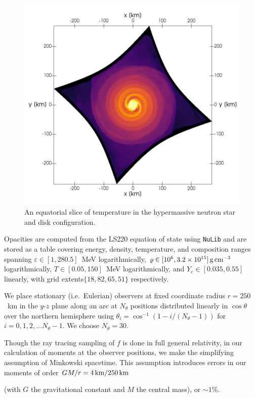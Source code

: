 \documentclass[aps,floatfix,prd,superscriptaddress,twocolumn]{revtex4-1}
\newcommand{\todo}[1]{\marginpar{\tiny{\textcolor{red}{#1}}}}
\renewcommand\todo[1]{} %
\begin{document}
\begin{figure}
  \includegraphics[width=\columnwidth]{production-colormap-equat-temp}
  \caption{An equatorial slice of temperature in the hypermassive neutron
    star and disk configuration.}
  \label{fig:nsns_temp_equat}
\end{figure}

Opacities are computed from the LS220 equation of state using
\lstinline{NuLib} and are stored as a table covering
energy, density, temperature, and composition ranges
spanning $\varepsilon\in[1,280.5]$~MeV logarithmically,
$\varrho\in[10^6,3.2\times10^{15}]\,{\rm g}\,{\rm cm}^{-3}$ logarithmically,
$T\in[0.05,150]$~MeV logarithmically, and 
$Y_e\in[0.035,0.55]$ linearly,
with grid extents$\{18,82,65,51\}$ respectively.

We place stationary (i.e.\ Eulerian) observers at fixed coordinate radius
$r=250$~km in the $y$-$z$ plane along an arc at $N_\theta$ positions
distributed linearly in $\cos\theta$ over the northern hemisphere
using $\theta_i=\cos^{-1}\left(1-i/(N_\theta-1)\right)$
for $i=0,1,2,\ldots N_\theta-1$.
We choose $N_\theta=30$.

Though the ray tracing sampling of $f$ is done in full general relativity,
in our calculation of moments at the observer positions,
we make the simplifying assumption of Minkowski spacetime.
This assumption introduces errors in our moments of order
$GM/r=4\,{\rm km}/250\,{\rm km}$
\todo{too simplistic}
(with $G$ the gravitational constant and $M$ the central mass),
or $\sim 1\%$.
\end{document}
